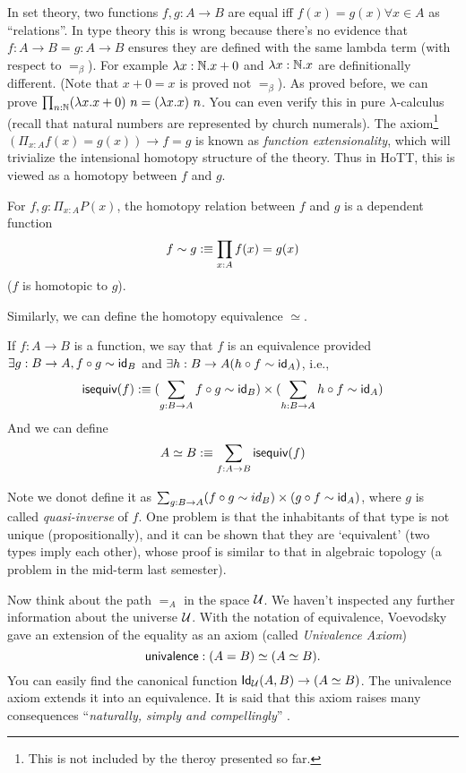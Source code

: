 In set theory, two functions $f,g: A\to B$ are equal iff 
$f(x)=g(x)\forall x\in A$ as ``relations''. In type theory this is wrong
because there's no evidence that $f: A\to B=g: A\to B$ ensures they are
defined with the same lambda term (with respect to $=_\beta$). For example 
$\lambda x:\mathbb{N}. x+0$ and $\lambda x:\mathbb{N}. x$ are definitionally different.
(Note that $x+0=x$ is proved not $=_\beta$). As proved before, we can
prove $\prod_{n:\nat}(\lambda x.x+0)\ n=(\lambda x.x)\ n$. You can even
verify this in pure $\lambda$-calculus (recall that natural numbers are
represented by church numerals). 
The axiom\footnote{This is not included by the theroy presented so far.}
$(\Pi_{x:A}f(x)=g(x))\to f = g$ is known as {\it function extensionality},
which will trivialize the intensional homotopy structure of the theory.
Thus in HoTT, this is viewed as a homotopy between $f$ and $g$.
\begin{definition}
    For $f,g:\Pi_{x:A}P(x)$, the homotopy relation between $f$ and $g$
    is a dependent function
    $$
        f\sim g:\equiv \prod_{x:A}f(x)=g(x)
    $$
    ($f$ is homotopic to $g$).
\end{definition}

\newcommand{\isequiv}{\name{isequiv}}
Similarly, we can define the homotopy equivalence $\simeq$.
\begin{definition}
    If $f:A\to B$ is a function, we say that $f$ is an equivalence provided
    $\exists g:B\to A,f\circ g\sim \text{\sf id}_B$ and 
    $\exists h:B\to A(h\circ f\sim \text{\sf id}_A)$, i.e., 
    $$
        \isequiv(f)\defn(\sum_{g:B\to A}f\circ g\sim \id_B)\times
        (\sum_{h:B\to A}h\circ f\sim \id_A)
    $$
    And we can define
    $$
        A\simeq B\defn\sum_{f:A\to B}\isequiv(f)
    $$
\end{definition}

Note we donot define it as $\sum_{g:B\to A}(f\circ g\sim id_B)\times
(g\circ f\sim \text{\sf id}_A)$, where $g$ is called {\it quasi-inverse} of $f$.
One problem is that the inhabitants of that type is not unique 
(propositionally), and it can be shown that they are `equivalent' (two 
types imply each other), whose proof is similar to that in algebraic 
topology (a problem in the mid-term last semester). 

Now think about the path $=_A$ in the space $\mathcal{U}$. We haven't 
inspected any further information about the universe $\mathcal{U}$.
With the notation of equivalence, Voevodsky gave an extension of the
equality as an axiom (called {\it Univalence Axiom})
\newcommand{\univalence}{\name{univalence}}
$$
    \univalence: (A=B)\simeq(A\simeq B).
$$
You can easily find the canonical function $\text{\sf Id}_{\mathcal{U}}(A,B)\to(A\simeq B)$. 
The univalence axiom extends it into an equivalence. It is said that this
axiom raises many consequences ``{\it naturally, simply and compellingly}''
\cite{homotopy-type-theory}. 

